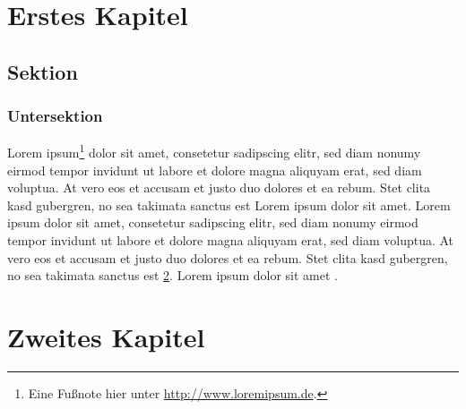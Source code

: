 
\chapter{Erstes Kapitel}

\section{Sektion}

\subsection{Untersektion}

Lorem ipsum\footnote{Eine Fußnote hier unter \url{http://www.loremipsum.de}.} dolor sit amet, consetetur sadipscing elitr, sed diam nonumy eirmod tempor invidunt ut labore et dolore magna aliquyam erat, sed diam voluptua. At vero eos et accusam et justo duo dolores et ea rebum. Stet clita kasd gubergren, no sea takimata sanctus est Lorem ipsum dolor sit amet. Lorem ipsum dolor sit amet, consetetur sadipscing elitr, sed diam nonumy eirmod tempor invidunt ut labore et dolore magna aliquyam erat, sed diam voluptua. At vero eos et accusam et justo duo dolores et ea rebum. Stet clita kasd gubergren, no sea takimata sanctus est \ref{chapter:second-chapter}. Lorem ipsum dolor sit amet \cite{Mai12}.

\chapter{Zweites Kapitel}
\label{chapter:second-chapter}

